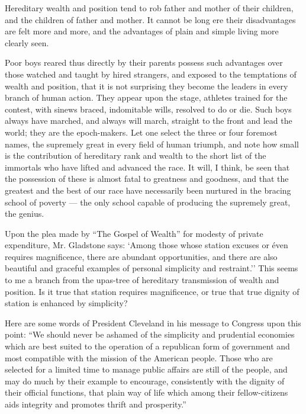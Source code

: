 \documentclass[11pt,openany]{book}
\begin{document}
Hereditary wealth and position tend to rob father and mother of their children, and the children of father and mother. It cannot be long ere their disadvantages are felt more and more, and the advantages of plain and simple living more clearly seen.

Poor boys reared thus directly by their parents possess such advantages over those watched and taught by hired strangers, and exposed to the temptations of wealth and position, that it is not surprising they become the leaders in every branch of human action. They appear upon the stage, athletes trained for the contest, with sinews braced, indomitable wills, resolved to do or die. Such boys always have marched, and always will march, straight to the front and lead the world; they are the epoch-makers. Let one select the three or four foremost names, the supremely great in every field of human triumph, and note how small is the contribution of hereditary rank and wealth to the short list of the immortals who have lifted and advanced the race. It will, I think, be seen that the possession of these is almost fatal to greatness and goodness, and that the greatest and the best of our race have necessarily been nurtured in the bracing school of poverty --- the only school capable of producing the supremely great, the genius.

Upon the plea made by ``The Gospel of Wealth'' for modesty of private expenditure, Mr. Gladstone says: `Among those whose station excuses or éven requires magnificence, there are abundant opportunities, and there are also beautiful and graceful examples of personal simplicity and restraint.'' This seems to me a branch from the upas-tree of hereditary transmission of wealth and position. Is it true that station requires magnificence, or true that true dignity of station is enhanced by simplicity?

Here are some words of President Cleveland in his message to Congress upon this point: ``We should never be ashamed of the simplicity and prudential economies which are best suited to the operation of a republican form of government and most compatible with the mission of the American people. Those who are selected for a limited time to manage public affairs are still of the people, and may do much by their example to encourage, consistently with the dignity of their official functions, that plain way of life which among their fellow-citizens aids integrity and promotes thrift and prosperity.''
\end{document}
